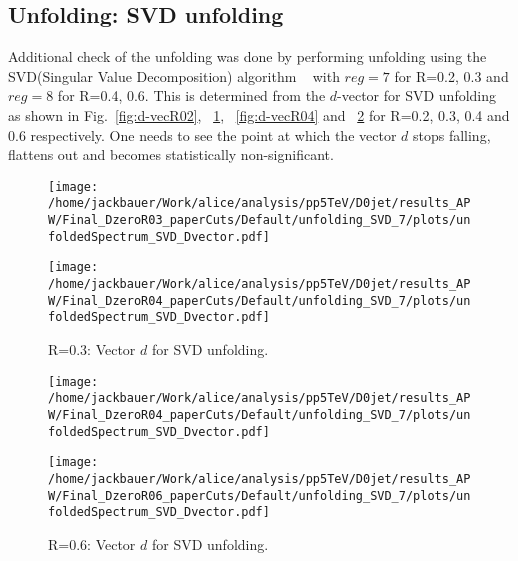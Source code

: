 \subsection{Unfolding: SVD unfolding}
\label{sUnfoldSysSVD}

Additional check of the unfolding was done by performing unfolding using the SVD(Singular Value Decomposition) algorithm ~\cite{Hocker:1995kb} with $reg=7$ for R=0.2, 0.3 and $reg=8$ for R=0.4, 0.6. This is determined from the $d$-vector for SVD unfolding as shown in Fig.~\ref{fig:d-vecR02}, ~\ref{fig:d-vecR03}, ~\ref{fig:d-vecR04} and ~\ref{fig:d-vecR06} for R=0.2, 0.3, 0.4 and 0.6 respectively. One needs to see the point at which the vector $d$ stops falling, flattens out and becomes statistically non-significant.

\begin{figure}
\centering
\begin{minipage}{.5\textwidth}
  \centering
  \texttt{[image: /home/jackbauer/Work/alice/analysis/pp5TeV/D0jet/results\_APW/Final\_DzeroR03\_paperCuts/Default/unfolding\_SVD\_7/plots/unfoldedSpectrum\_SVD\_Dvector.pdf]}
  \caption{R=0.2: Vector $d$ for SVD unfolding.}
  \label{fig:d-vecR02}
\end{minipage}%
\begin{minipage}{.5\textwidth}
  \centering
  \texttt{[image: /home/jackbauer/Work/alice/analysis/pp5TeV/D0jet/results\_APW/Final\_DzeroR04\_paperCuts/Default/unfolding\_SVD\_7/plots/unfoldedSpectrum\_SVD\_Dvector.pdf]}
  \caption{R=0.3: Vector $d$ for SVD unfolding.}
  \label{fig:d-vecR03}
\end{minipage}
\end{figure}
\begin{figure}
\centering
\begin{minipage}{.5\textwidth}
  \centering
  \texttt{[image: /home/jackbauer/Work/alice/analysis/pp5TeV/D0jet/results\_APW/Final\_DzeroR04\_paperCuts/Default/unfolding\_SVD\_7/plots/unfoldedSpectrum\_SVD\_Dvector.pdf]}
  \caption{R=0.4: Vector $d$ for SVD unfolding.}
  \label{fig:d-vecR04}
\end{minipage}%
\begin{minipage}{.5\textwidth}
  \centering
  \texttt{[image: /home/jackbauer/Work/alice/analysis/pp5TeV/D0jet/results\_APW/Final\_DzeroR06\_paperCuts/Default/unfolding\_SVD\_7/plots/unfoldedSpectrum\_SVD\_Dvector.pdf]}
  \caption{R=0.6: Vector $d$ for SVD unfolding.}
  \label{fig:d-vecR06}
\end{minipage}
\end{figure}

